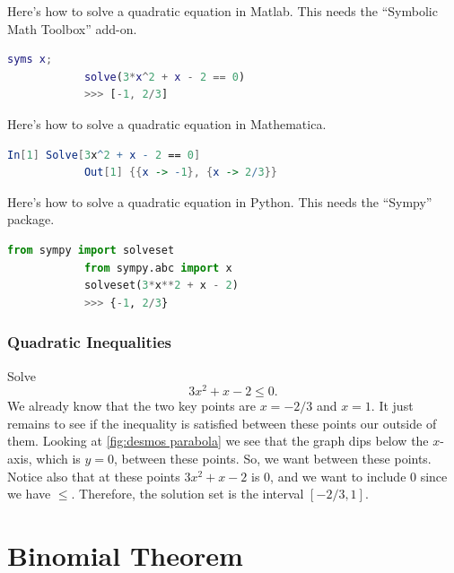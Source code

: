 \documentclass[fleqn]{LectureClass/LectureClass}
\begin{document}
    \begin{cde}{}{}
        Here's how to solve a quadratic equation in Matlab.
        This needs the \enquote{Symbolic Math Toolbox} add-on.
        \begin{lstlisting}[gobble=12, language=Matlab]
            syms x;
            solve(3*x^2 + x - 2 == 0)
            >>> [-1, 2/3]
        \end{lstlisting}
        
        Here's how to solve a quadratic equation in Mathematica.
        \begin{lstlisting}[gobble=12, language=Mathematica]
             In[1] Solve[3x^2 + x - 2 == 0]
            Out[1] {{x -> -1}, {x -> 2/3}}
        \end{lstlisting}
        
        Here's how to solve a quadratic equation in Python.
        This needs the \enquote{Sympy} package.
        \begin{lstlisting}[gobble=12, language=python]
            from sympy import solveset
            from sympy.abc import x
            solveset(3*x**2 + x - 2)
            >>> {-1, 2/3}
        \end{lstlisting}
    \end{cde}
    
    \subsection{Quadratic Inequalities}
    \begin{exm}{}{}
        Solve
        \begin{equation}
            3x^2 + x - 2 \le 0.
        \end{equation}
        We already know that the two key points are \(x = -2/3\) and \(x = 1\).
        It just remains to see if the inequality is satisfied between these points our outside of them.
        Looking at \cref{fig:desmos parabola} we see that the graph dips below the \(x\)-axis, which is \(y = 0\), between these points.
        So, we want between these points.
        Notice also that at these points \(3x^2 + x - 2\) is \(0\), and we want to include \(0\) since we have \(\le\).
        Therefore, the solution set is the interval \([-2/3, 1]\).
    \end{exm}
    
    \chapter{Binomial Theorem}
\end{document}
